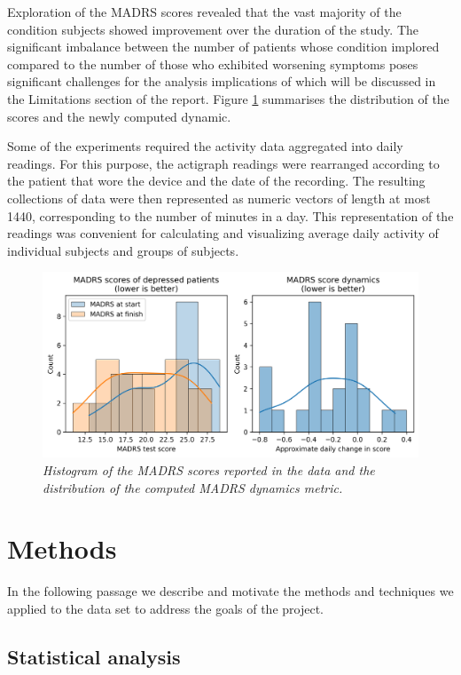 \documentclass[12pt]{article}
\begin{document}
Exploration of the MADRS scores revealed that the vast majority of the condition subjects showed improvement over the duration of the study. The significant imbalance between the number of patients whose condition implored compared to the number of those who exhibited worsening symptoms poses significant challenges for the analysis implications of which will be discussed in the Limitations section of the report. Figure \ref{fig:madrs} summarises the distribution of the scores and the newly computed dynamic.

Some of the experiments required the activity data aggregated into daily readings. For this purpose, the actigraph readings were rearranged according to the patient that wore the device and the date of the recording. The resulting collections of data were then represented as numeric vectors of length at most 1440, corresponding to the number of minutes in a day. This representation of the readings was convenient for calculating and visualizing average daily activity of individual subjects and groups of subjects.

\begin{figure}[!h]
    \centering
    \includegraphics[width=.99\textwidth]{images/madrs.png}
    \captionsetup{justification=centering}
    \caption{\textit{Histogram of the MADRS scores reported in the data and the distribution of the computed MADRS dynamics metric.}}
    \label{fig:madrs}
\end{figure}

\section{Methods}

In the following passage we describe and motivate the methods and techniques we applied to the data set to address the goals of the project.

\subsection{Statistical analysis}
\end{document}
